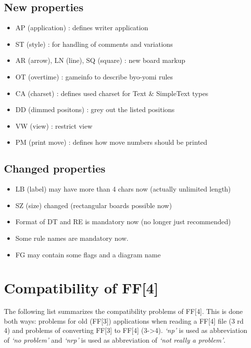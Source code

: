 \subsection{New properties}\label{new-properties}

\begin{itemize}
\item
  AP (application) : defines writer application
\item
  ST (style) : for handling of comments and variations
\item
  AR (arrow), LN (line), SQ (square) : new board markup
\item
  OT (overtime) : gameinfo to describe byo-yomi rules
\item
  CA (charset) : defines used charset for Text \& SimpleText types
\item
  DD (dimmed positons) : grey out the listed positions
\item
  VW (view) : restrict view
\item
  PM (print move) : defines how move numbers should be printed
\end{itemize}

\subsection{Changed properties}\label{changed-properties}

\begin{itemize}
\item
  LB (label) may have more than 4 chars now (actually unlimited length)
\item
  SZ (size) changed (rectangular boards possible now)
\item
  Format of DT and RE is mandatory now (no longer just recommended)
\item
  Some rule names are mandatory now.
\item
  FG may contain some flags and a diagram name
\end{itemize}

\newpage

\section{Compatibility of FF{[}4{]}}\label{compatibility-of-ff4}

The following list summarizes the compatibility problems of FF{[}4{]}.
This is done both ways: problems for old (FF{[}3{]}) applications when
reading a FF{[}4{]} file (3 rd 4) and problems of converting FF{[}3{]}
to FF{[}4{]} (3-\textgreater4). \emph{`np'} is used as abbreviation of
\emph{`no problem'} and \emph{`nrp'} is used as abbreviation of
\emph{`not really a problem'}.

